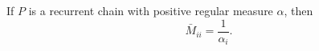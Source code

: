 If $P$ is a recurrent chain with positive regular measure $\alpha$, then
$$\bar{M}_{ii} = \frac{1}{\alpha_i}.$$
